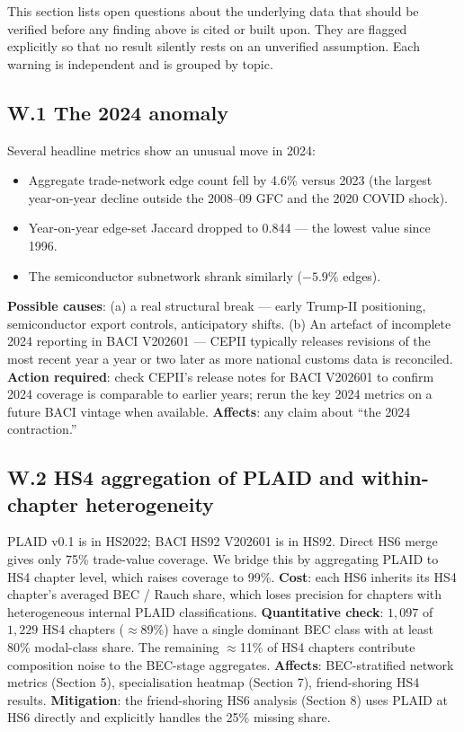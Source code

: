 \documentclass[11pt,a4paper]{article}
\begin{document}
This section lists open questions about the underlying data that should be
verified before any finding above is cited or built upon. They are flagged
explicitly so that no result silently rests on an unverified assumption.
Each warning is independent and is grouped by topic.

\subsection*{W.1 The 2024 anomaly}

\begin{warnbox}
Several headline metrics show an unusual move in 2024:
\begin{itemize}[leftmargin=*]
  \item Aggregate trade-network edge count fell by 4.6\% versus 2023
        (the largest year-on-year decline outside the 2008--09 GFC and
        the 2020 COVID shock).
  \item Year-on-year edge-set Jaccard dropped to 0.844 — the lowest
        value since 1996.
  \item The semiconductor subnetwork shrank similarly ($-5.9$\% edges).
\end{itemize}
\textbf{Possible causes}: (a) a real structural break — early Trump-II
positioning, semiconductor export controls, anticipatory shifts.
(b) An artefact of incomplete 2024 reporting in BACI V202601 — CEPII
typically releases revisions of the most recent year a year or two later
as more national customs data is reconciled.
\textbf{Action required}: check CEPII's release notes for BACI V202601
to confirm 2024 coverage is comparable to earlier years; rerun the
key 2024 metrics on a future BACI vintage when available.
\textbf{Affects}: any claim about ``the 2024 contraction.''
\end{warnbox}

\subsection*{W.2 HS4 aggregation of PLAID and within-chapter heterogeneity}

\begin{warnbox}
PLAID v0.1 is in HS2022; BACI HS92 V202601 is in HS92. Direct HS6 merge
gives only 75\% trade-value coverage. We bridge this by aggregating
PLAID to HS4 chapter level, which raises coverage to 99\%.
\textbf{Cost}: each HS6 inherits its HS4 chapter's averaged BEC / Rauch
share, which loses precision for chapters with heterogeneous internal
PLAID classifications.
\textbf{Quantitative check}: $1{,}097$ of $1{,}229$ HS4 chapters
($\approx$89\%) have a single dominant BEC class with at least 80\%
modal-class share. The remaining $\approx$11\% of HS4 chapters
contribute composition noise to the BEC-stage aggregates.
\textbf{Affects}: BEC-stratified network metrics (Section 5),
specialisation heatmap (Section 7), friend-shoring HS4 results.
\textbf{Mitigation}: the friend-shoring HS6 analysis (Section 8) uses
PLAID at HS6 directly and explicitly handles the 25\% missing share.
\end{warnbox}
\end{document}
